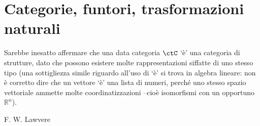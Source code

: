 \chapter{Categorie, funtori, trasformazioni naturali}\label{chap_cat_fun_nat}
\epigraph{
	Sarebbe inesatto affermare che una data categoria \(\ctC\) `è' una categoria di strutture, dato che possono esistere molte rappresentazioni siffatte di uno stesso tipo (una sottigliezza simile riguardo all'uso di `è' si trova in algebra lineare: non è corretto dire che un vettore `è' una lista di numeri, perché uno stesso spazio vettoriale ammette molte coordinatizzazioni --cioè isomorfismi con un opportuno \(\mathbb{R}^n\)).
}{F. W. Lawvere}








